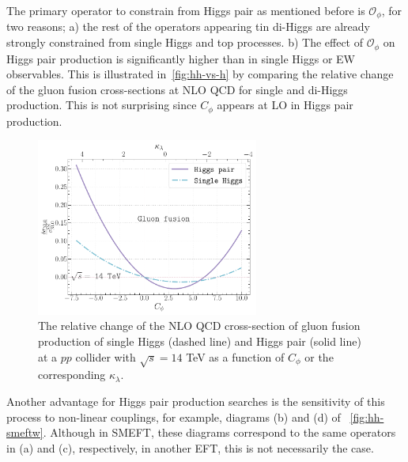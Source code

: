 The primary operator to constrain from Higgs pair as mentioned before is $\mathcal{O}_{\phi}$, for two reasons; a) the rest of the operators appearing tin di-Higgs are already strongly constrained from single Higgs and top processes. b) The effect of $\mathcal{O}_{\phi}$ on Higgs pair production is significantly higher than in single Higgs or EW observables. This is illustrated in~\autoref{fig:hh-vs-h} by comparing the relative change of the gluon fusion cross-sections at NLO QCD for single and di-Higgs production. This is not surprising since $C_\phi$ appears at LO in Higgs pair production.
\begin{figure}[h!]
	\begin{center}
		\includegraphics[width=0.65\textwidth]{figures/trilinear_single_vs_double}
		\caption{ The relative change of the NLO QCD cross-section of gluon fusion production of single Higgs (dashed line) and Higgs pair (solid line) at a $pp$ collider with $\sqrt{s}=14$ TeV as a function of $C_\phi$ or the corresponding $\kappa_\lambda$. \label{fig:hh-vs-h} }
	\end{center}
\end{figure}
Another advantage for Higgs pair production searches is the sensitivity of this process to non-linear couplings, for example, diagrams (b) and (d) of ~\autoref{fig:hh-smeftw}. Although in SMEFT, these diagrams correspond to the same operators in (a) and (c), respectively, in another EFT, this is not necessarily the case.
